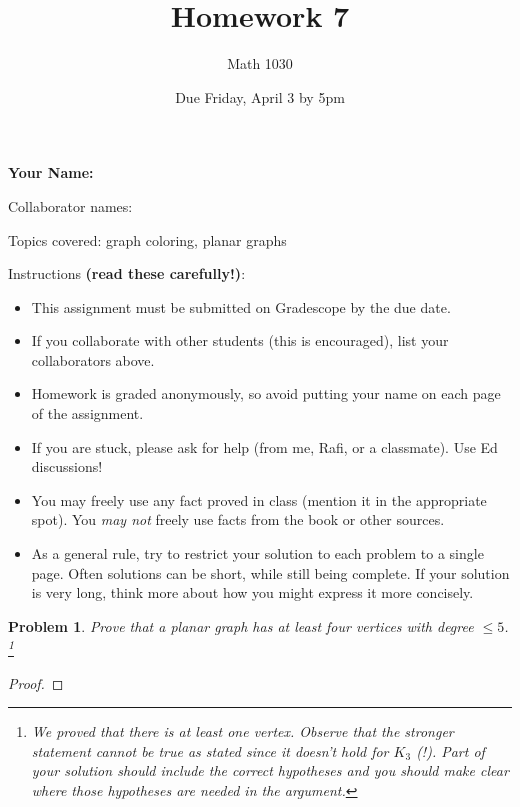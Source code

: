 \documentclass[11pt]{article}
\author{Math 1030}
\date{Due Friday, April 3 by 5pm}
\title{Homework 7}
\newtheorem{problem}{Problem}
\begin{document}
\maketitle

{\bf\Large Your Name:} 

Collaborator names: 

\vspace{.3in}
Topics covered: graph coloring, planar graphs

Instructions {\bf (read these carefully!)}: 
\begin{itemize}
\item This assignment must be submitted on Gradescope by the due date. 
\item If you collaborate with other students (this is encouraged),  list your collaborators above. 
\item Homework is graded anonymously, so avoid putting your name on each page of the assignment.
\item If you are stuck, please ask for help (from me, Rafi, or a classmate). Use Ed discussions!  
\item You may freely use any fact proved in class (mention it in the appropriate spot). You \emph{may not} freely use facts from the book or other sources.
\item As a general rule, try to restrict your solution to each problem to a single page. Often solutions can be short, while still being complete. If your solution is very long, think more about how you might express it more concisely.
\end{itemize}


\pagebreak 

\begin{problem}
Prove that a planar graph has at least four vertices with degree $\le5$. \footnote{We proved that there is at least one vertex. Observe that the stronger statement cannot be true as stated since it doesn't hold for $K_3$ (!).  Part of your solution should include the correct hypotheses and you should make clear where those hypotheses are needed in the argument.}
\end{problem}

\begin{proof}


\end{proof}

\pagebreak 
\end{document}
